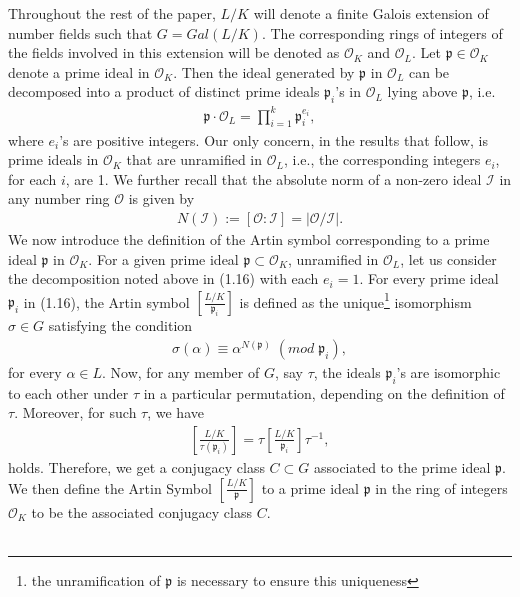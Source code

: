 \documentclass[12pt]{article}
\numberwithin{equation}{section}
\numberwithin{equation}{section}
\begin{document}
Throughout the rest of the paper, $L/K$ will denote a finite Galois extension of number fields such that $G= Gal(L/K)$. The corresponding rings of integers of the fields involved in this extension will be denoted as $\mathcal{O}_K$ and $\mathcal{O}_L$. Let $\mathfrak{p} \in \mathcal{O}_K$ denote a prime ideal in $\mathcal{O}_K$. Then the ideal generated by $\mathfrak{p}$ in $\mathcal{O}_L$ can be decomposed into a product of distinct prime ideals $\mathfrak{p}_i$'s in $\mathcal{O}_L$ lying above $\mathfrak{p}$, i.e. 
\begin{align}
    \mathfrak{p}\cdot\mathcal{O}_L = \prod_{i=1}^k \mathfrak{p}_i^{e_i}, 
\end{align}
where $e_i$'s are positive integers. Our only concern, in the results that follow, is prime ideals in $\mathcal{O}_K$ that are unramified in $\mathcal{O}_L$, i.e., the corresponding integers $e_i$, for each $i$, are 1. We further recall that the absolute norm of a non-zero ideal $\mathcal{I}$ in any number ring $\mathcal{O}$ is given by
\begin{align}
    N(\mathcal{I}):=[\mathcal{O}:\mathcal{I}] = |\mathcal{O}/\mathcal{I}|. \nonumber
\end{align}
We now introduce the definition of the Artin symbol corresponding to a prime ideal $\mathfrak{p}$ in $\mathcal{O}_K$. For a given prime ideal $\mathfrak{p} \subset \mathcal{O}_K$, unramified in $\mathcal{O}_L$, let us consider the decomposition noted above in (1.16) with each $e_i=1$. For every prime ideal $\mathfrak{p}_i$ in (1.16), the Artin symbol $\left[\frac{L/K}{\mathfrak{p}_i}\right]$ is defined as the unique\footnote[3]{the unramification of $\mathfrak{p}$ is necessary to ensure this uniqueness} isomorphism $\sigma \in G$ satisfying the condition
\begin{align}
    \sigma(\alpha) \equiv \alpha^{N(\mathfrak{p})}\;(mod\;\mathfrak{p}_i), \nonumber
\end{align}
for every $\alpha \in L$. Now, for any member of $G$, say $\tau$, the ideals $\mathfrak{p}_i$'s are isomorphic to each other under $\tau$ in a particular permutation, depending on the definition of $\tau$. Moreover, for such $\tau$, we have
\begin{align}
    \left[\frac{L/K}{\tau(\mathfrak{p}_i)}\right] = \tau\left[\frac{L/K}{\mathfrak{p}_i}\right]\tau^{-1}, \nonumber
\end{align}
holds. Therefore, we get a conjugacy class $C \subset G$ associated to the prime ideal $\mathfrak{p}$. We then define the Artin Symbol $\left[\frac{L/K}{\mathfrak{p}}\right]$  to a prime ideal $\mathfrak{p}$ in the ring of integers $\mathcal{O}_K$ to be the associated conjugacy class $C$. \\ \\
\end{document}
